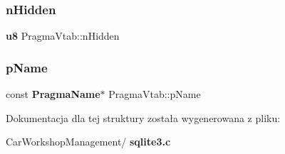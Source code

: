 \mbox{\label{struct_pragma_vtab_a35131d693653e37c757eeb6f1ff1a0fc}} 
\subsubsection{nHidden}
{\footnotesize\ttfamily \textbf{ u8} Pragma\+Vtab\+::n\+Hidden}

\mbox{\label{struct_pragma_vtab_a71f8c640ec4f34272d6540c696ee1d8a}} 
\subsubsection{pName}
{\footnotesize\ttfamily const \textbf{ Pragma\+Name}$\ast$ Pragma\+Vtab\+::p\+Name}



Dokumentacja dla tej struktury została wygenerowana z pliku\+:\begin{DoxyCompactItemize}
\item 
Car\+Workshop\+Management/\textbf{ sqlite3.\+c}\end{DoxyCompactItemize}
